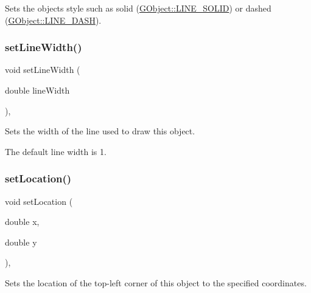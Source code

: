 Sets the object\textquotesingle{}s style such as solid (\mbox{\hyperlink{classsgl_1_1GObject_a86e0f5648542856159bb40775c854aa7a700c78bc2cd76acaab26651bf7b4941f}{G\+Object\+::\+L\+I\+N\+E\+\_\+\+S\+O\+L\+ID}}) or dashed (\mbox{\hyperlink{classsgl_1_1GObject_a86e0f5648542856159bb40775c854aa7a9ccba0845f785d81d07b333ae1aad84e}{G\+Object\+::\+L\+I\+N\+E\+\_\+\+D\+A\+SH}}). 

\mbox{\label{classsgl_1_1GObject_afd6a47c6ea6a1f85ca05a65ba3ff3477}} 
\subsubsection{\texorpdfstring{set\+Line\+Width()}{setLineWidth()}}
{\footnotesize\ttfamily void set\+Line\+Width (\begin{DoxyParamCaption}\item[{double}]{line\+Width }\end{DoxyParamCaption})\hspace{0.3cm}{\ttfamily [virtual]}, {\ttfamily [inherited]}}



Sets the width of the line used to draw this object. 

The default line width is 1. \mbox{\label{classsgl_1_1GObject_a04594e8ba9b98513a64f1da00dcae18c}} 
\subsubsection{\texorpdfstring{set\+Location()}{setLocation()}\hspace{0.1cm}{\footnotesize\ttfamily [1/2]}}
{\footnotesize\ttfamily void set\+Location (\begin{DoxyParamCaption}\item[{double}]{x,  }\item[{double}]{y }\end{DoxyParamCaption})\hspace{0.3cm}{\ttfamily [virtual]}, {\ttfamily [inherited]}}



Sets the location of the top-\/left corner of this object to the specified coordinates. 

